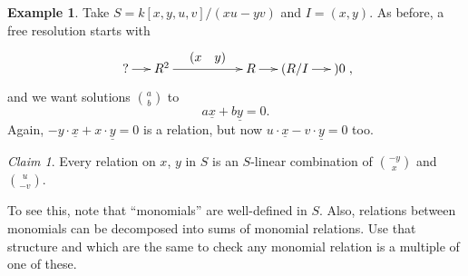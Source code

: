 \documentclass[11pt]{book}
\numberwithin{equation}{section}
\numberwithin{theorem}{chapter}
\theoremstyle{definition}
\newtheorem{example}[theorem]{Example}
\newtheorem*{basic properties}{Basic Properties}
\newtheorem*{Important Remark}{Important Remark}
\theoremstyle{remark}
\newtheorem*{claim*}{Claim}
\begin{document}
\begin{example}
	Take $S = k[x,y,u,v]/(xu-yv)$ and $I = (x,y)$. As before, a free resolution starts with
$$\xymatrix@C=5mm{? \ar[r] & R^2 \ar[rrr]^-{\begin{array}{cc} (x & y) \end{array}} &&& R \ar[r] & (R/I \ar[r] &) 0},$$	
and we want solutions ${a \choose b}$ to
$$a\underline{x}+b\underline{y} = 0.$$
Again, $-y \cdot \underline{x} + x \cdot \underline{y} = 0$ is a relation, but now $u \cdot \underline{x} - v \cdot \underline{y} = 0$ too.

\begin{claim*}
		Every relation on $x$, $y$ in $S$ is an $S$-linear combination of ${-y \choose x}$ and ${u \choose -v}$.
\end{claim*}
To see this, note that ``monomials'' are well-defined in $S$. Also, relations between monomials can be decomposed into sums of monomial relations. Use that structure and which are the same to check any monomial relation is a multiple of one of these.


\end{example}
\end{document}
